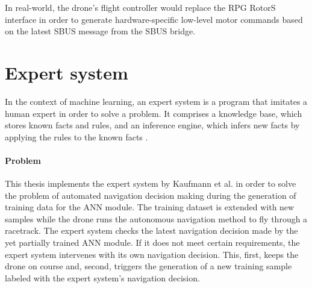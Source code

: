 In real-world, the drone's flight controller would replace the 
RPG RotorS interface in order to generate hardware-specific low-level
motor commands based on the latest SBUS message from the SBUS bridge.








\section{Expert system} \label{sec:expert_system}

In the context of machine learning, 
an expert system is a program that imitates a human expert
in order to solve a problem. 
It comprises a knowledge base,
which stores known facts and rules, and an
inference engine, which infers new facts 
by applying the rules to the known facts \cite{osti_5675197}.

\paragraph*{Problem} $\ $\\
This thesis implements the expert system 
by Kaufmann et al. \cite{Kaufmann2018}
in order to solve the problem of automated navigation decision making
during the generation of training data for the ANN module.
The training dataset is extended with new samples 
while the drone runs the autonomous navigation method to fly through a racetrack.
The expert system checks the latest navigation decision 
made by the yet partially trained ANN module.
If it does not meet certain requirements,
the expert system intervenes with its own navigation decision.
This, first, keeps the drone on course and, second,
triggers the generation of a new training sample labeled 
with the expert system's navigation decision.

